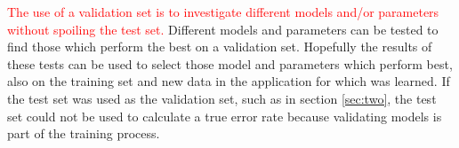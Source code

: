 \documentclass[a4paper,11pt]{article}
\newcommand{\highlightColor}{red}
\begin{document}
\begin{enumerate}
\textcolor{\highlightColor}{ 
The use of a validation set is to investigate different models and/or
parameters without spoiling the test set.}
Different models and parameters can be tested to find those which perform the best on a validation 
set. Hopefully the results of these tests can be used to select those 
model and parameters which perform best, also on the training set and new 
data in the application for which was learned. 
If the test set was used as the validation set, such 
as in section \ref{sec:two}, the test set could not be used to calculate a 
true error rate because validating models is part of the training process. 

\end{enumerate}
\end{document}
